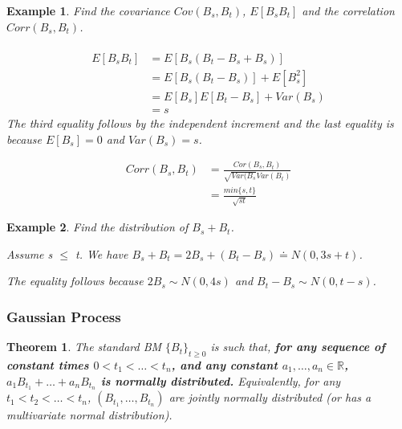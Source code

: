 \documentclass[12pt]{article}
\newtheorem{theorem}{Theorem}
\newtheorem{example}{Example}
\begin{document}
\begin{example}
    Find the covariance $Cov(B_s, B_t)$, $E[B_sB_t]$ and the correlation $Corr(B_s,B_t)$.
    \\
    \\
    \begin{equation*}
        \begin{split}
            E[B_sB_t] & = E[B_s(B_t-B_s+B_s)] \\
            & = E[B_s(B_t - B_s)] + E[B_s^2] \\
            & = E[B_s]E[B_t - B_s] + Var(B_s) \\
            & = s
        \end{split}
    \end{equation*}
    The third equality follows by the independent increment and the last equality is because $E[B_s] = 0$ and $Var(B_s) = s$.
    \begin{center}
        \begin{align*}
            Corr(B_s,B_t) & = \frac{Cor(B_s,B_t)}{\sqrt{Var(B_s}Var(B_t)} \\
            & = \frac{min\{s,t\}}{\sqrt{st}}
        \end{align*}
    \end{center}
\end{example}

\begin{example}
    Find the distribution of $B_s + B_t$.
    \begin{center}
        Assume s $\leq$ t. We have $B_s + B_t = 2B_s + (B_t - B_s) \doteq N(0,3s+t)$.
    \end{center}
    The equality follows because $2B_s \sim N(0,4s)$ and $B_t - B_s \sim N(0,t-s)$.
\end{example}

\subsubsection{Gaussian Process}

\begin{theorem}
    The standard BM $\{B_t\}_{t\geq 0}$ is such that, \textbf{for any sequence of constant times $0 < t_1 < \dots < t_n$, and any constant $a_1, \dots, a_n \in \mathbb{R}$, $a_1B_{t_1}+\dots +a_nB_{t_n}$ is normally distributed.}
    Equivalently, for any $t_1 < t_2 < \dots < t_n$, $(B_{t_1}, \dots, B_{t_n})$ are jointly normally distributed (or has a multivariate normal distribution).
\end{theorem}
\end{document}
